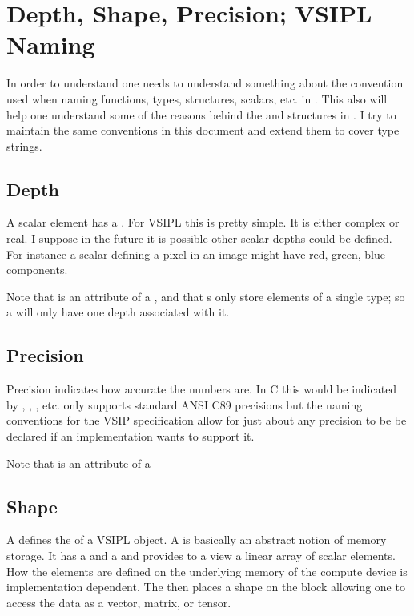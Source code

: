 \clearpage
\section*{Depth, Shape, Precision; VSIPL Naming}
In order to understand \cvl one needs to understand something about the convention used when naming functions, types, structures, scalars, etc. in \cvl. This also will help one understand some of the reasons behind the  and  structures in \cvl. I try to maintain the same conventions in this document and extend them to cover \pyjv type strings.
%
\subsection*{Depth}
A scalar element has a .  For VSIPL this is pretty simple.  It is either complex or real. I suppose in the future it is possible other scalar depths could be defined. For instance a scalar defining a pixel in an image might have red, green, blue components. 

Note that  is an attribute of a , and that s only store elements of a single type; so a  will only have one depth associated with it. 
%
\subsection*{Precision}
Precision indicates how accurate the numbers are. In C this would be indicated by , , , etc. \jv only supports standard ANSI C89 precisions but the naming conventions for the VSIP specification allow for just about any precision to be be declared if an implementation wants to support it.

Note that  is an attribute of a 
%
\subsection*{Shape}
A  defines the  of a VSIPL object. A  is basically an abstract notion of memory storage. It has a  and a  and provides to a view a linear array of scalar elements.  How the elements are defined on the underlying memory of the compute device is implementation dependent. The  then places a shape on the block allowing one to access the data as a vector, matrix, or tensor. 

